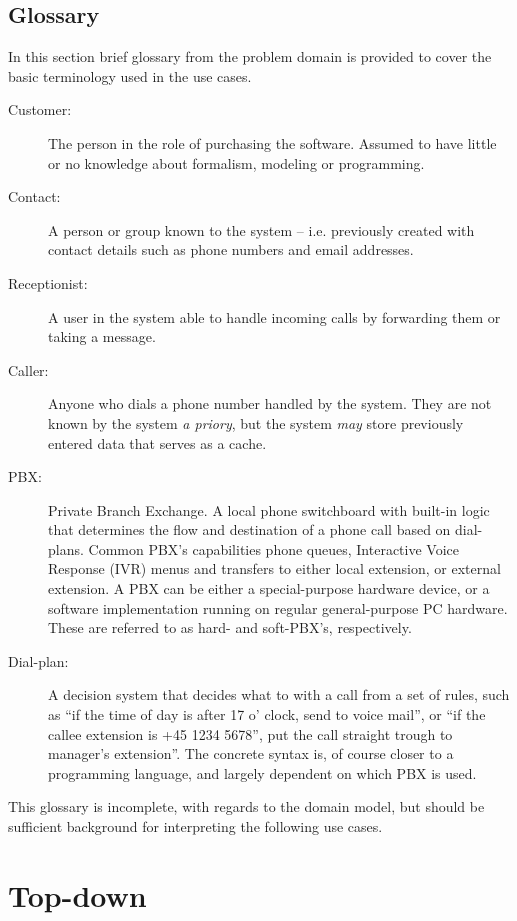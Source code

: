\documentclass[10pt]{scrreprt}
\begin{document}
\section{Glossary}
In this section brief glossary from the problem domain is provided to cover the basic terminology used in the use cases.
\begin{description}
  \item[Customer:] The person in the role of purchasing the software. Assumed to have little or no knowledge about formalism, modeling or programming.
  \item[Contact:] A person or group known to the system -- i.e. previously created with contact details such as phone numbers and email addresses.
  \item[Receptionist:] A user in the system able to handle incoming calls by forwarding them or taking a message.
  \item[Caller:] Anyone who dials a phone number handled by the system. They are not known by the system \textit{a priory}, but the system \textit{may} store previously entered data that serves as a cache.
  \item[PBX:] Private Branch Exchange. A local phone switchboard with built-in logic that determines the flow and destination of a phone call based on dial-plans. Common PBX's capabilities phone queues, Interactive Voice Response (IVR) menus and transfers to either local extension, or external extension. A PBX can be either a special-purpose hardware device, or a software implementation running on regular general-purpose PC hardware. These are referred to as hard- and soft-PBX's, respectively.
  \item[Dial-plan:] A decision system that decides what to with a call from a set of rules, such as ``if the time of day is after 17 o' clock, send to voice mail'', or ``if the callee extension is +45 1234 5678'', put the call straight trough to manager's extension''. The concrete syntax is, of course closer to a programming language, and largely dependent on which PBX is used.
\end{description}
This glossary is incomplete, with regards to the domain model, but should be sufficient background for interpreting the following use cases.

\chapter{Top-down}
\end{document}
